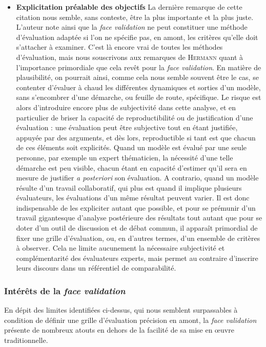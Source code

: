 \begin{itemize}
	\item \textbf{Explicitation préalable des objectifs}
	La dernière remarque de cette citation nous semble, sans conteste, être la plus importante et la plus juste.
	L'auteur note ainsi que la \textit{face validation} ne peut constituer une méthode d'évaluation adaptée si l'on ne spécifie pas, en amont, les critères qu'elle doit s'attacher à examiner.
	C'est là encore vrai de toutes les méthodes d'évaluation, mais nous souscrivons aux remarques de H\textsc{ermann} quant à l'importance primordiale que cela revêt pour la \textit{face validation}.
	En matière de plausibilité, on pourrait ainsi, comme cela nous semble souvent être le cas, se contenter d'évaluer \og à chaud\fg{} les différentes dynamiques et sorties d'un modèle, sans s'encombrer d'une démarche, ou feuille de route, spécifique.
	Le risque est alors d'introduire encore plus de subjectivité dans cette analyse, et en particulier de briser la capacité de reproductibilité ou de justification d'une évaluation :
	une évaluation peut être subjective tout en étant justifiée, appuyée par des arguments, et dès lors, reproductible si tant est que chacun de ces éléments soit explicités.
	Quand un modèle est évalué par une seule personne, par exemple un expert thématicien, la nécessité d'une telle démarche est peu visible, chacun étant en capacité d'estimer qu'il sera en mesure de justifier \textit{a posteriori} son évaluation.
	A contrario, quand un modèle résulte d'un travail collaboratif, qui plus est quand il implique plusieurs évaluateurs, les évaluations d'un même résultat peuvent varier.
	Il est donc indispensable de les expliciter autant que possible, et pour se prémunir d'un travail gigantesque d'analyse postérieure des résultats tout autant que pour se doter d'un outil de discussion et de débat commun, il apparaît primordial de fixer une grille d'évaluation, ou, en d'autres termes, d'un ensemble de critères à observer.
	Cela ne limite aucunement la nécessaire subjectivité et complémentarité des évaluateurs experts, mais permet au contraire d'inscrire leurs discours dans un référentiel de comparabilité.
	
\end{itemize}

\subsubsection{Intérêts de la \textit{face validation}}

En dépit des limites identifiées ci-dessus, qui nous semblent surpassables à condition de définir une grille d'évaluation précision en amont, la \textit{face validation} présente de nombreux atouts en dehors de la facilité de sa mise en œuvre traditionnelle.

